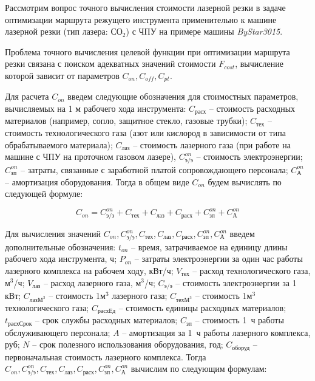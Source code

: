 \documentclass[11pt,twoside,openany]{report}
\begin{document}
Рассмотрим вопрос точного вычисления
стоимости лазерной резки в задаче
оптимизации маршрута режущего инструмента
применительно к машине лазерной резки (тип лазера: СО$_2$)
с ЧПУ на примере машины
{\it ByStar3015}.

Проблема точного вычисления целевой функции
при оптимизации маршрута резки связана с
поиском адекватных значений стоимости
$F_{cost}$,
вычисление которой зависит от параметров
$C_{on}, C_{off}, C_{pt}$.

Для расчета
$C_{on}$
введем следующие обозначения для стоимостных параметров,
вычисляемых на 1 м рабочего хода инструмента:
$C_\text{расх}$ -- стоимость расходных материалов (например, сопло, защитное стекло, газовые трубки);
$C_\text{тех}$ -- стоимость технологического газа (азот или кислород в зависимости от типа обрабатываемого материала);
$C_\text{лаз}$ -- стоимость лазерного газа (при работе на машине с ЧПУ на проточном газовом лазере),
$C_\text{э/э}^{on}$ -- стоимость электроэнергии;
$C_\text{зп}^{on}$ -- затраты, связанные с заработной платой сопровождающего персонала;
$C_\text{А}^{on}$ -- амортизация оборудования.
Тогда в общем виде
$C_{on}$
будем вычислять по следующей формуле:

\begin{equation}
  C_{on} =
  C_\text{э/э}^{on} +
  C_\text{тех} +
  C_\text{лаз} +
  C_\text{расх} +
  C_\text{зп}^{on} +
  C_\text{А}^{on}
  \label{c-on}
\end{equation}

Для вычисления значений
$C_{on}, C_\text{э/э}^{on}, C_\text{тех},
C_\text{лаз}, C_\text{расх}, C_\text{зп}^{on}, C_\text{А}^{on}$
введем дополнительные обозначения:
$t_{on}$ -- время, затрачиваемое на единицу длины рабочего хода инструмента, ч;
$P_{on}$ -- затраты электроэнергии за один час работы лазерного комплекса на рабочем ходу, кВт/ч;
$V_\text{тех}$ -- расход технологического газа, м$^3$/ч;
$V_\text{лаз}$ -- расход лазерного газа, м$^3$/ч;
$C_\text{э/э}$ -- стоимость электроэнергии за 1 кВт;
$C_{\text{лазМ}^3}$ -- стоимость 1м$^3$ лазерного газа;
$C_{\text{техМ}^3}$ -- стоимость 1м$^3$ технологического газа;
$C_\text{расхЕд}$ -- стоимость единицы расходных материалов;
$t_\text{расхСрок}$ -- срок службы расходных материалов;
$C_\text{зп}$ -- стоимость 1~ч работы обслуживающего персонала;
$A$ -- амортизация за 1~ч работы лазерного комплекса, руб;
$N$ -- срок полезного использования оборудования, год;
$C_\text{оборуд}$ -- первоначальная стоимость лазерного комплекса.
Тогда
$C_{on}, C_\text{э/э}^{on}, C_\text{тех},
C_\text{лаз}, C_\text{расх}, C_\text{зп}^{on}, C_\text{А}^{on}$
вычислим по следующим формулам:
\end{document}
